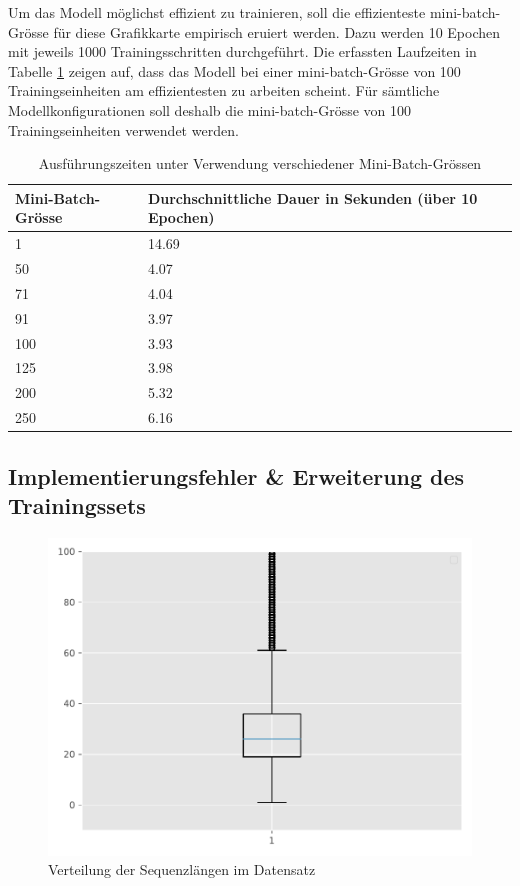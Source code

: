 Um das Modell möglichst effizient zu trainieren, soll die effizienteste \gls{mini-batch}-Grösse für diese Grafikkarte empirisch eruiert werden.
Dazu werden 10 Epochen mit jeweils 1000 Trainingsschritten durchgeführt.
Die erfassten Laufzeiten in Tabelle \ref{tab:best-batch-size} zeigen auf, dass das Modell bei einer \gls{mini-batch}-Grösse von 100 Trainingseinheiten
am effizientesten zu arbeiten scheint.
Für sämtliche Modellkonfigurationen soll deshalb die \gls{mini-batch}-Grösse von 100 Trainingseinheiten verwendet werden.

\begin{center}
    \begin{table}
        \centering
        \begin{tabular}{ |l|l| }

            \hline
            \textbf{Mini-Batch-Grösse} & \textbf{Durchschnittliche Dauer in Sekunden (über 10 Epochen)} \\
            \hline
            1 & 14.69 \\
            50 & 4.07 \\
            71 & 4.04 \\
            91 & 3.97 \\
            100 & 3.93 \\
            125 & 3.98 \\
            200 & 5.32 \\
            250 & 6.16 \\
            \hline
        \end{tabular}
        \caption{Ausführungszeiten unter Verwendung verschiedener Mini-Batch-Grössen}
        \label{tab:best-batch-size}
    \end{table}
\end{center}


\subsection{Implementierungsfehler \& Erweiterung des Trainingssets}
\label{subsec:enhancing-training-set}

\begin{figure}
    \centering
    \includegraphics[width=0.75\linewidth]{images/analysis/histogram-lengths.pdf}
    \caption{Verteilung der Sequenzlängen im Datensatz }
    \label{fig:sequence-lengths}
\end{figure}

